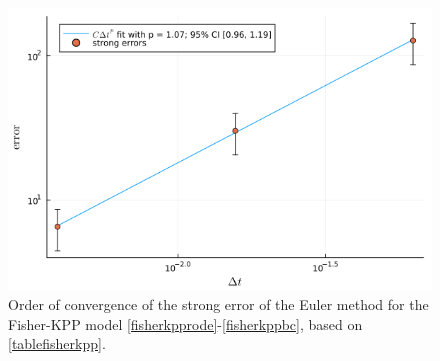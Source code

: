 \documentclass[reqno,12pt]{amsart}
\theoremstyle{plain} %
\theoremstyle{definition} %
\begin{document}
\begin{figure}[htb]
    \includegraphics[scale=0.6]{img/order_fisherkpp.png}
    \caption{Order of convergence of the strong error of the Euler method for the Fisher-KPP model \eqref{fisherkpprode}-\eqref{fisherkppbc}, based on \cref{tablefisherkpp}.}
    \label{figfisherkpp}
\end{figure}
\end{document}
